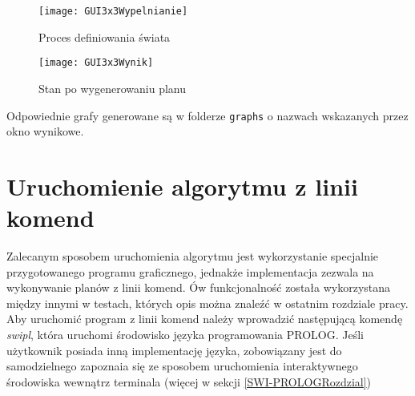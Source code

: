     \begin{figure}[H]
        \texttt{[image: GUI3x3Wypelnianie]}
        \centering
        \caption{Proces definiowania świata}
    \end{figure}

    \begin{figure}[H]
        \texttt{[image: GUI3x3Wynik]}
        \centering
        \caption{Stan po wygenerowaniu planu}
    \end{figure}

    Odpowiednie grafy generowane są w folderze \texttt{graphs} o nazwach wskazanych przez okno wynikowe.
\section{Uruchomienie algorytmu z linii komend}
    \label{CommandLine}
    Zalecanym sposobem uruchomienia algorytmu jest wykorzystanie specjalnie przygotowanego programu graficznego, jednakże implementacja zezwala na 
    wykonywanie planów z linii komend. Ów funkcjonalność została wykorzystana między innymi w testach, których opis można znaleźć w ostatnim rozdziale pracy.
    Aby uruchomić program z linii komend należy wprowadzić następującą komendę \textit{swipl}, która uruchomi środowisko języka programowania PROLOG.
    Jeśli użytkownik posiada inną implementację języka, zobowiązany jest do samodzielnego zapoznaia się ze sposobem uruchomienia interaktywnego 
    środowiska wewnątrz terminala (więcej w sekcji \ref{SWI-PROLOGRozdzial})
